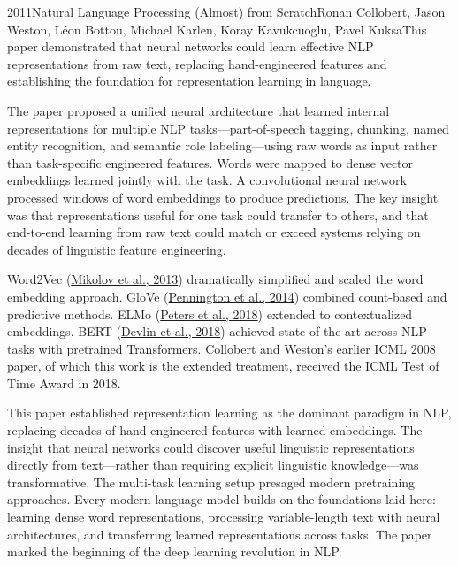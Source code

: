 
\begin{papersummary}{2011}{Natural Language Processing (Almost) from Scratch}{Ronan Collobert, Jason Weston, L\'{e}on Bottou, Michael Karlen, Koray Kavukcuoglu, Pavel Kuksa}{This paper demonstrated that neural networks could learn effective NLP representations from raw text, replacing hand-engineered features and establishing the foundation for representation learning in language.}

The paper proposed a unified neural architecture that learned internal representations for multiple NLP tasks---part-of-speech tagging, chunking, named entity recognition, and semantic role labeling---using raw words as input rather than task-specific engineered features. Words were mapped to dense vector embeddings learned jointly with the task. A convolutional neural network processed windows of word embeddings to produce predictions. The key insight was that representations useful for one task could transfer to others, and that end-to-end learning from raw text could match or exceed systems relying on decades of linguistic feature engineering.

Word2Vec (\hyperref[paper:mikolov-2013]{Mikolov et al., 2013}) dramatically simplified and scaled the word embedding approach. GloVe (\hyperref[paper:pennington-2014]{Pennington et al., 2014}) combined count-based and predictive methods. ELMo (\hyperref[paper:peters-2018]{Peters et al., 2018}) extended to contextualized embeddings. BERT (\hyperref[paper:devlin-2018]{Devlin et al., 2018}) achieved state-of-the-art across NLP tasks with pretrained Transformers. Collobert and Weston's earlier ICML 2008 paper, of which this work is the extended treatment, received the ICML Test of Time Award in 2018.

This paper established representation learning as the dominant paradigm in NLP, replacing decades of hand-engineered features with learned embeddings. The insight that neural networks could discover useful linguistic representations directly from text---rather than requiring explicit linguistic knowledge---was transformative. The multi-task learning setup presaged modern pretraining approaches. Every modern language model builds on the foundations laid here: learning dense word representations, processing variable-length text with neural architectures, and transferring learned representations across tasks. The paper marked the beginning of the deep learning revolution in NLP.

\end{papersummary}
